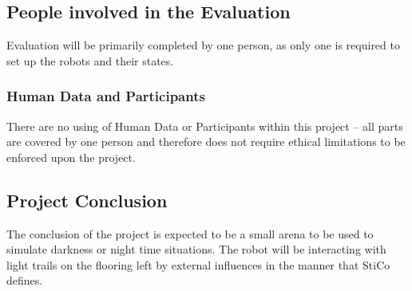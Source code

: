 \subsection{People involved in the Evaluation} \label{desEvalPeople}
Evaluation will be primarily completed by one person, as only one is required to
set up the robots and their states.

\subsubsection{Human Data and Participants} \label{desEvalHDP}
There are no using of Human Data or Participants within this project -- all
parts are covered by one person and therefore does not require ethical 
limitations to be enforced upon the project.

\subsection{Project Conclusion} \label{desEvalCon}
The conclusion of the project is expected to be a small arena to be used to
simulate darkness or night time situations.  The robot will be interacting with
light trails on the flooring left by external influences in the manner that
StiCo defines.

\clearpage
